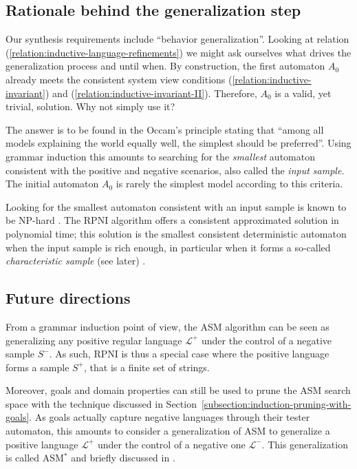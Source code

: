 \subsection{Rationale behind the generalization step}

Our synthesis requirements include ``behavior generalization''. Looking at relation (\ref{relation:inductive-language-refinements}) we might ask ourselves what drives the generalization process and until when. By construction, the first automaton $A_0$ already meets the consistent system view conditions (\ref{relation:inductive-invariant}) and (\ref{relation:inductive-invariant-II}). Therefore, $A_0$ is a valid, yet trivial, solution. Why not simply use it?

The answer is to be found in the Occam's principle stating that ``among all models explaining the world equally well, the simplest should be preferred''. Using grammar induction this amounts to searching for the \emph{smallest} automaton consistent with the positive and negative scenarios, also called the \emph{input sample}. The initial automaton $A_0$ is rarely the simplest model according to this criteria. 

Looking for the smallest automaton consistent with an input sample is known to be NP-hard \cite{Gold:1978, Angluin:1978}. The RPNI algorithm offers a consistent approximated solution in polynomial time; this solution is the smallest consistent deterministic automaton when the input sample is rich enough, in particular when it forms a so-called \emph{characteristic sample} (see later) \cite{Oncina:1992}.

\subsection{Future directions}

From a grammar induction point of view, the ASM algorithm can be seen as generalizing any positive regular language $\mathcal{L}^+$ under the control of a negative sample $S^-$. As such, RPNI is thus a special case where the positive language forms a sample $S^+$, that is a finite set of strings.

Moreover, goals and domain properties can still be used to prune the ASM search space with the technique discussed in Section~\ref{subsection:induction-pruning-with-goals}. As goals actually capture negative languages through their tester automaton, this amounts to consider a generalization of ASM to generalize a positive language $\mathcal{L}^+$ under the control of a negative one $\mathcal{L}^-$. This generalization is called ASM$^*$ and briefly discussed in \cite{Lambeau:2008}.
